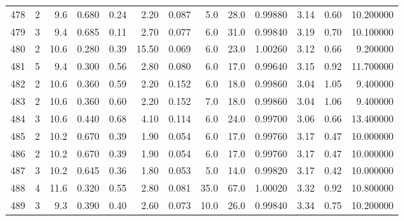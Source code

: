 \begin{tabular}{lrrrrrrrrrrrr}
478  &        2 &            9.6 &             0.680 &         0.24 &            2.20 &      0.087 &                  5.0 &                  28.0 &  0.99880 &  3.14 &       0.60 &  10.200000 \\
479  &        3 &            9.4 &             0.685 &         0.11 &            2.70 &      0.077 &                  6.0 &                  31.0 &  0.99840 &  3.19 &       0.70 &  10.100000 \\
480  &        2 &           10.6 &             0.280 &         0.39 &           15.50 &      0.069 &                  6.0 &                  23.0 &  1.00260 &  3.12 &       0.66 &   9.200000 \\
481  &        5 &            9.4 &             0.300 &         0.56 &            2.80 &      0.080 &                  6.0 &                  17.0 &  0.99640 &  3.15 &       0.92 &  11.700000 \\
482  &        2 &           10.6 &             0.360 &         0.59 &            2.20 &      0.152 &                  6.0 &                  18.0 &  0.99860 &  3.04 &       1.05 &   9.400000 \\
483  &        2 &           10.6 &             0.360 &         0.60 &            2.20 &      0.152 &                  7.0 &                  18.0 &  0.99860 &  3.04 &       1.06 &   9.400000 \\
484  &        3 &           10.6 &             0.440 &         0.68 &            4.10 &      0.114 &                  6.0 &                  24.0 &  0.99700 &  3.06 &       0.66 &  13.400000 \\
485  &        2 &           10.2 &             0.670 &         0.39 &            1.90 &      0.054 &                  6.0 &                  17.0 &  0.99760 &  3.17 &       0.47 &  10.000000 \\
486  &        2 &           10.2 &             0.670 &         0.39 &            1.90 &      0.054 &                  6.0 &                  17.0 &  0.99760 &  3.17 &       0.47 &  10.000000 \\
487  &        3 &           10.2 &             0.645 &         0.36 &            1.80 &      0.053 &                  5.0 &                  14.0 &  0.99820 &  3.17 &       0.42 &  10.000000 \\
488  &        4 &           11.6 &             0.320 &         0.55 &            2.80 &      0.081 &                 35.0 &                  67.0 &  1.00020 &  3.32 &       0.92 &  10.800000 \\
489  &        3 &            9.3 &             0.390 &         0.40 &            2.60 &      0.073 &                 10.0 &                  26.0 &  0.99840 &  3.34 &       0.75 &  10.200000 \\

\end{tabular}
